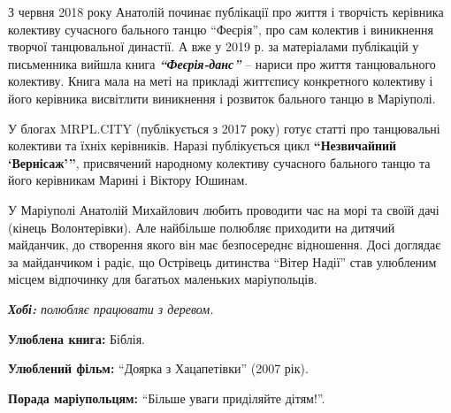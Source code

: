 З червня 2018 року Анатолій починає публікації про життя і творчість керівника
колективу сучасного бального танцю \enquote{Феєрія}, про сам колектив і виникнення
творчої танцювальної династії. А вже у 2019 р. за матеріалами публікацій у
письменника вийшла книга \textbf{\emph{\enquote{Феєрія-данс}}} – нариси про життя танцювального
колективу. Книга мала на меті на прикладі життєпису конкретного колективу і
його керівника висвітлити виникнення і розвиток бального танцю в Маріуполі.

У блогах MRPL.CITY  (публікується з 2017 року) готує статті про танцювальні
колективи та їхніх керівників. Наразі публікується цикл \textbf{\enquote{Незвичайний
\enquote{Вернісаж}}}, присвячений народному колективу сучасного бального танцю та його
керівникам Марині і Віктору Юшинам.

У Маріуполі Анатолій Михайлович любить проводити час на морі та своїй дачі
(кінець Волонтерівки). Але найбільше полюбляє приходити на дитячий майданчик,
до створення якого він має безпосереднє відношення. Досі доглядає за майданчиком
і радіє, що Острівець дитинства \enquote{Вітер Надії} став улюбленим місцем
відпочинку для багатьох маленьких маріупольців.

\begingroup
\em
\textbf{Хобі:} полюбляє працювати з деревом.

\textbf{Улюблена книга:} Біблія.

\textbf{Улюблений фільм:} \enquote{Доярка з Хацапетівки} (2007 рік).

\textbf{Порада маріупольцям:} \enquote{Більше уваги приділяйте дітям!}.
\endgroup
